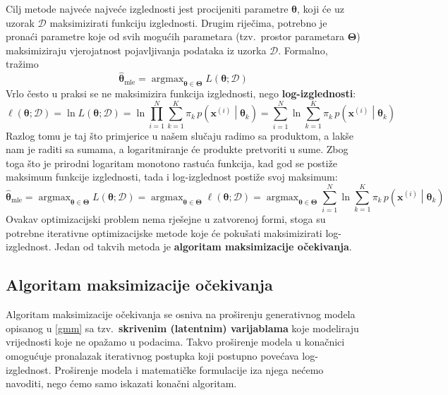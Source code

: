 \documentclass[times, utf8, zavrsni]{fer}
\DeclareMathOperator*{\argmax}{argmax}
\begin{document}
Cilj metode najveće najveće izglednosti jest procijeniti parametre $\boldsymbol{\theta}$, koji će uz uzorak $\mathcal{D}$ maksimizirati funkciju izglednosti. Drugim riječima, potrebno je pronaći parametre koje od svih mogućih parametara (tzv.\ prostor parametara $\boldsymbol{\Theta}$) maksimiziraju vjerojatnost pojavljivanja podataka iz uzorka $\mathcal{D}$. Formalno, tražimo
\[\widehat{\boldsymbol{\theta}}_{\text{mle}} =
\argmax_{\boldsymbol{\theta} \in \boldsymbol{\Theta}}
L \left(\boldsymbol{\theta} ; \mathcal{D} \right)
\]
Vrlo često u praksi se ne maksimizira funkcija izglednosti, nego \textbf{log-izglednosti}:
\[\ell \left(\boldsymbol{\theta} ; \mathcal{D} \right) 
= \ln {L \left(\boldsymbol{\theta} ; \mathcal{D} \right)}
= \ln{\prod_{i=1}^{N} 
\sum_{k=1}^{K} \pi_k \, p \left(\mathbf{x}^{(i)} \middle| \boldsymbol{\theta}_k\right)}
= \sum_{i=1}^{N} \ln{ 
\sum_{k=1}^{K} \pi_k \, p \left(\mathbf{x}^{(i)} \middle| \boldsymbol{\theta}_k\right)
}
\]
Razlog tomu je taj što primjerice u našem slučaju radimo sa produktom, a lakše nam je raditi sa sumama, a logaritmiranje će produkte pretvoriti u sume. Zbog toga što je prirodni logaritam monotono rastuća funkcija, kad god se postiže maksimum funkcije izglednosti, tada i log-izglednost postiže svoj maksimum:
\[\widehat{\boldsymbol{\theta}}_{\text{mle}} =
\argmax_{\boldsymbol{\theta} \in \boldsymbol{\Theta}}
L \left(\boldsymbol{\theta} ; \mathcal{D} \right)
= \argmax_{\boldsymbol{\theta} \in \boldsymbol{\Theta}}
\ell \left(\boldsymbol{\theta} ; \mathcal{D} \right)
= \argmax_{\boldsymbol{\theta} \in \boldsymbol{\Theta}}
\sum_{i=1}^{N} \ln{ 
\sum_{k=1}^{K} \pi_k \, p \left(\mathbf{x}^{(i)} \middle| \boldsymbol{\theta}_k\right)
}
\]
Ovakav optimizacijski problem nema rješejne u zatvorenoj formi, stoga su potrebne iterativne optimizacijske metode koje će pokušati maksimizirati log-izglednost. Jedan od takvih metoda je \textbf{algoritam maksimizacije očekivanja}.

\subsection{Algoritam maksimizacije očekivanja}
Algoritam maksimizacije očekivanja  se osniva na proširenju generativnog modela opisanog u \ref{gmm} sa tzv.\ \textbf{skrivenim (latentnim) varijablama} koje modeliraju vrijednosti koje ne opažamo u podacima. Takvo proširenje modela u konačnici omogućuje pronalazak iterativnog postupka koji postupno povećava log-izglednost. Proširenje modela i matematičke formulacije iza njega nećemo navoditi, nego ćemo samo iskazati konačni algoritam.
\end{document}
